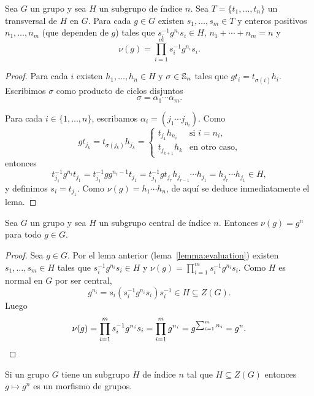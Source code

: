 
\begin{lemma}
	\label{lemma:evaluation}
	Sea $G$ un grupo y sea $H$ un subgrupo de índice $n$. Sea
	$T=\{t_1,\dots,t_n\}$ un transversal de $H$ en $G$.  Para cada $g\in G$
	existen $s_{1},\dots,s_{m}\in T$ y enteros positivos $n_1,\dots,n_m$
	(que dependen de $g$) tales que 
	$s_i^{-1}g^{n_i}s_i\in H$,
	$n_1+\cdots+n_m=n$ y 
	\[
		\nu(g)=\prod_{i=1}^m s_i^{-1}g^{n_i}s_i.
	\]
\end{lemma}


\begin{proof}
	Para cada $i$ existen $h_1,\dots,h_n\in H$ y $\sigma\in\mathbb{S}_n$ tales que
	$gt_i=t_{\sigma(i)}h_i$. Escribimos $\sigma$ como producto de ciclos
	disjuntos
	\[
		\sigma=\alpha_1\cdots\alpha_m.
	\]

	Para cada $i\in\{1,\dots,n\}$, escribamos 
	$\alpha_i=(j_{1}\cdots j_{n_i})$. Como 
	\[
		g t_{j_k}=t_{\sigma(j_k)}h_{j_k}=\begin{cases}
			t_{j_1}h_{n_i} & \text{si $i=n_i$},\\
			t_{j_{k+1}}h_{k} & \text{en otro caso},
		\end{cases}
	\]
	entonces
	\[
	t_{j_1}^{-1}g^{n_i}t_{j_1}
	=t_{j_1}^{-1}gg^{n_i-1}t_{j_1}
	=t_{j_1}^{-1}gt_{j_r}h_{j_{r-1}}\cdots h_{j_1}
	=h_{j_r}\cdots h_{j_1}\in H,
	\]
	y definimos $s_i=t_{j_1}$. Como $\nu(g)=h_1\cdots h_{n}$, 
	de aquí se deduce inmediatamente el lema.
\end{proof}

\begin{proposition}
	\label{proposition:v(g)=g^n}
	Sea $G$ un grupo y sea $H$ un subgrupo central de índice $n$. 
	Entonces $\nu(g)=g^n$ para todo $g\in G$.
\end{proposition}

\begin{proof}
	Sea $g\in G$. Por el lema anterior (lema~\ref{lemma:evaluation}) existen $s_1,\dots,s_m\in
	H$ tales que $s_i^{-1}g^{n_i}s_i\in H$ y $\nu(g)=\prod_{i=1}^m
	s_i^{-1}g^{n_i}s_i$.  Como $H$ es normal en $G$ por ser central,
	\[
	g^{n_i}=s_i(s_i^{-1}g^{n_i}s_i)s_i^{-1}\in H\subseteq Z(G).
	\]
	Luego 
	\[
		\nu(g)
		=\prod_{i=1}^m s_i^{-1}g^{n_i}s_i
		=\prod_{i=1}^m g^{n_i}
		=g^{\sum_{i=1}^m n_i}
		=g^n.\qedhere 
	\]
\end{proof}

\begin{corollary}
	Si un grupo $G$ tiene un subgrupo $H$ de índice $n$ tal que $H\subseteq
	Z(G)$ entonces $g\mapsto g^n$ es un morfismo de grupos.
\end{corollary}


